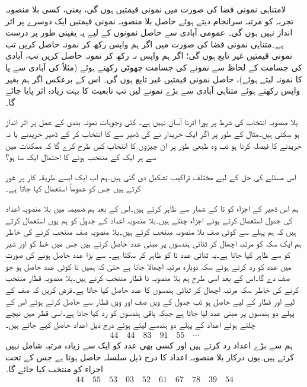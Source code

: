 لامتناہی نمونی فضا کی صورت میں نمونی قیمتیں  ہوں گی، یعنی، کسی بلا منصوبہ تجربہ کو  مرتبہ سرانجام دیتے ہوئے حاصل  بلا منصوبہ نمونی قیمتیں ایک دوسرے پر اثر انداز نہیں ہوں گی۔ عمومی آبادی سے حاصل نمونوں کے لیے یہ یقینی طور پر  درست ہے۔متناہی نمونی فضا کی صورت میں اگر ہم واپس رکھ کر نمونہ حاصل کریں تب نمونی قیمتیں غیر تابع ہوں گی؛ اگر ہم واپس نہ رکھ کر نمونہ حاصل کریں تب،  آبادی کی جسامت کے لحاظ سے نمونے کی جسامت چھوٹی رکھتے ہوئے (مثلاً  کی آبادی سے  یا  کا نمونہ  لیتے ہوئے)، حاصل نمونی قیمتیں  غیر تابع ہوں گی۔ اس کے برعکس اگر ہم بغیر واپس رکھتے ہوئے متناہی آبادی سے بڑے نمونے لیں تب تابعیت کا بہت زیادہ اثر پایا جائے گا۔

بلا منصوبہ انتخاب کی شرط پر پورا اترنا آسان نہیں ہے۔ کئی وجوہات نمونہ بندی کے عمل پر اثر انداز ہو سکتی ہیں۔مثال کے طور پر اگر ایک خریدار نے  کی  ڈھیر سے  کا انتخاب کر کے ڈھیر خریدنے یا نہ خریدنے  کا فیصلہ کرنا ہو  تب وہ طبعی طور پر ان  چیزوں کا انتخاب کس طرح کرے گا کہ  ممکنات میں سے ہر ایک کے منتخب ہونے کا احتمال ایک سا ہو؟

اس مسئلے کی حل کے لیے مختلف تراکیب تشکیل دی گئی ہیں۔ہم اب  ایک ایسے طریقہ کار پر غور کرتے ہیں جس کو عموماً استعمال کیا جاتا ہے۔

ہم اس ڈھیر کے اجزاء کو  تا  کے شمار سے ظاہر کرتے ہیں۔اس کے بعد ہم ضمیمہ  میں بلا منصوبہ اعداد کی جدول استعمال کرتے ہوئے  اجزاء چنتے ہیں۔بلا منصوبہ اعداد کے جدول کو ہم یوں استعمال کرتے ہیں کہ ہم پہلے  سے  کوئی صف بلا منصوبہ منتخب کرتے ہیں۔بلا منصوبہ صف منتخب کرنے کی خاطر ہم ایک سکہ کو  مرتبہ اچھال کر  ثنائی ہندسوں پر مبنی عدد حاصل کرتے ہیں جس میں خط کو  اور شیر کو  سے ظاہر کیا جاتا ہے۔یہ ثنائی عدد  تا  کو ظاہر کر سکتا ہے۔ سے بڑا عدد حاصل ہونے کی صورت میں عدد کو رد کرتے ہوئے سکہ دوبارہ  مرتبہ اچھالا جاتا ہے حتیٰ کہ ہمیں  تا  کوئی عدد حاصل ہو جو صف دے گا۔اس کے بعد اسی طرح ہم بلا منصوبہ  تا  قطار منتخب کرتے ہیں۔بلا منصوبہ قطار منتخب کرنے کی خاطر سکہ  مرتبہ اچھال کر  ثنائی ہندسوں کا عدد حاصل کیا جاتا ہے۔فرض کریں کہ صف کے لیے  اور قطار کے لیے  حاصل ہو تب جدول کے  ویں صف اور  ویں قطار سے  حاصل کرتے ہوئے اس کے پہلے دو ہندسوں پر مبنی عدد  لیا جاتا ہے جبکہ باقی ہندسوں کو رد کیا جاتا ہے۔اسی قطر میں نیچے چلتے ہوئے اعداد کے پہلے دو ہندسے لیتے ہوئے درج ذیل اعداد حاصل کیے جاتے ہیں۔
\begin{align*}
44\quad 44\quad 83\quad 91\quad 55\quad \cdots
\end{align*}
ہم  سے بڑے اعداد رد کرتے ہیں اور کسی بھی عدد کو ایک سے زیادہ مرتبہ شامل نہیں کرتے ہیں۔یوں درکار بلا منصوبہ اعداد کا درج ذیل سلسلہ حاصل ہوتا ہے جس کے تحت اجزاء کو منتخب کیا جائے گا۔
\begin{align*}
44\quad 55\quad 53\quad 03\quad 52\quad 61\quad 67\quad 78\quad 39\quad 54
\end{align*}

